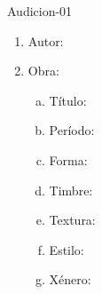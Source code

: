 \begin{defproblem}{Audicion-01}
\begin{ejercicio}[]
	\begin{enumerate}[1.-]
        \vspace*{0.3cm}
		\item
			Autor: \dotfill
			\vspace*{0.3cm}
		\item
			Obra:
			\begin{enumerate}[a)]
			    \item Título: \dotfill \vspace*{0.3cm}
			    \item Período: \dotfill \vspace*{0.3cm}
			    \item Forma: \dotfill \vspace*{0.3cm}
			    \item Timbre: \dotfill \vspace*{0.3cm} 		
			    \item Textura: \dotfill \vspace*{0.3cm}
			    \item Estilo: \dotfill \vspace*{0.3cm}
			    \item Xénero: \dotfill \vspace*{0.3cm}
			\end{enumerate}
			\vspace*{2.0cm}			
	\end{enumerate}
\end{ejercicio}
\end{defproblem}
